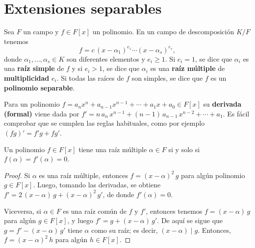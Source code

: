 
\section{Extensiones separables}

\begin{definicion}
  Sea $F$ un campo y $f\in F [x]$ un polinomio. En un campo de descomposición
  $K/F$ tenemos
  $$f = c\,(x-\alpha_1)^{e_1} \cdots (x - \alpha_s)^{e_s},$$
  donde $\alpha_1,\ldots,\alpha_s \in K$ son diferentes elementos y
  $e_i \ge 1$. Si $e_i = 1$, se dice que $\alpha_i$ es una \textbf{raíz simple} de
  $f$ y si $e_i > 1$, se dice que $\alpha_i$ es una \textbf{raíz múltiple} de
  \textbf{multiplicidad} $e_i$. Si todas las raíces de $f$ son simples, se dice
  que $f$ es un \textbf{polinomio separable}.
\end{definicion}

Para un polinomio
$f = a_n x^n + a_{n-1} x^{n-1} + \cdots + a_1 x + a_0 \in F [x]$
su \textbf{derivada (formal)} viene dada por
$f' = n\,a_n\,x^{n-1} + (n-1)\,a_{n-1}\,x^{n-2} + \cdots + a_1$.
Es fácil comprobar que se cumplen las reglas habituales, como por ejemplo
$(fg)' = f' g + f g'$.

\begin{proposicion}
  Un polinomio $f \in F [x]$ tiene una raíz múltiple $\alpha \in F$ si y solo si
  $f (\alpha) = f' (\alpha) = 0$.

  \begin{proof}
    Si $\alpha$ es una raíz múltiple, entonces $f = (x-\alpha)^2\,g$ para algún
    polinomio $g\in F [x]$. Luego, tomando las derivadas, se obtiene
    $f' = 2\,(x-\alpha)\,g + (x-\alpha)^2\,g'$, de donde $f' (\alpha) = 0$.

    Viceversa, si $\alpha \in F$ es una raíz común de $f$ y $f'$, entonces
    tenemos $f = (x-\alpha)\,g$ para algún $g \in F [x]$, y luego
    $f' = g + (x-\alpha)\,g'$.  De aquí se sigue que $g = f' - (x-\alpha)\,g'$
    tiene $\alpha$ como su raíz; es decir, $(x - \alpha) \mid g$. Entonces,
    $f = (x-\alpha)^2\,h$ para algún $h\in F [x]$.
  \end{proof}
\end{proposicion}

